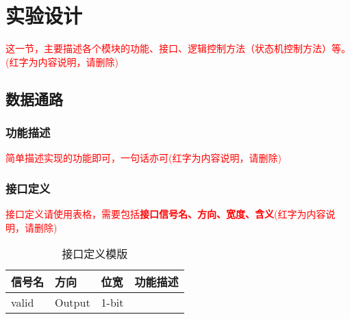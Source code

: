 \section{实验设计}
\textcolor{red}{这一节，主要描述各个模块的功能、接口、逻辑控制方法（状态机控制方法）等。(红字为内容说明，请删除)}
\subsection{数据通路}\label{sub:datapath}
\subsubsection{功能描述}
\textcolor{red}{简单描述实现的功能即可，一句话亦可(红字为内容说明，请删除)}
\subsubsection{接口定义}
\textcolor{red}{接口定义请使用表格，需要包括\textbf{接口信号名、方向、宽度、含义}(红字为内容说明，请删除)}

\begin{table}[htp]
\caption{接口定义模版}\label{tab:signaldef}
\begin{center}
	\begin{tabular}{|l|l|l|p{6cm}|}
	\hline
	\textbf{信号名} & \textbf{方向} & \textbf{位宽} & \textbf{功能描述}\\ \hline \hline
	valid			& Output& 1-bit & \\ 
	\hline
	\end{tabular}
\end{center}
\end{table}
